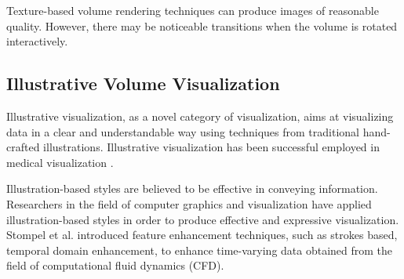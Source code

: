 Texture-based volume rendering techniques can produce images of reasonable quality. However, there may be noticeable transitions when the volume is rotated interactively.


\subsection{Illustrative Volume Visualization}

Illustrative visualization, as a novel category of visualization, aims at visualizing data in a clear and understandable way using techniques from traditional hand-crafted illustrations.
Illustrative visualization has been successful employed in medical visualization \cite{svakhine_illustration_2005} \cite{viola_importance-driven_2005} \cite{svakhine_illustration-inspired_2009}.

Illustration-based styles are believed to be effective in conveying information. Researchers in the field of computer graphics and visualization have applied illustration-based styles in order to produce effective and expressive visualization. Stompel et al. \cite{stompel_visualization_2002} introduced feature enhancement techniques, such as strokes based, temporal domain enhancement, to enhance time-varying data obtained from the field of computational fluid dynamics (CFD).

